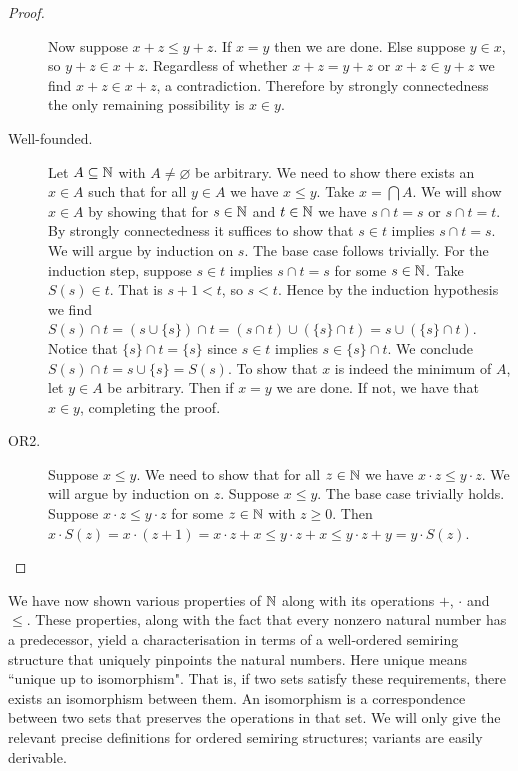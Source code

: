 \documentclass[../main.tex]{subfiles}
\begin{document}
\begin{proof}
\begin{description}
        Now suppose $x+z\leq y+z$. If $x=y$ then we are done. Else suppose $y\in x$, so $y+z\in x+z$. Regardless of whether $x+z=y+z$ or $x+z\in y+z$ we find $x+z\in x+z$, a contradiction. Therefore by strongly connectedness the only remaining possibility is $x\in y$.
        \item[Well-founded.] Let $A\subseteq\mathbb{N}$ with $A\neq\varnothing$ be arbitrary. We need to show there exists an $x\in A$ such that for all $y\in A$ we have $x\leq y$. Take $x=\bigcap A$. We will show $x\in A$ by showing that for $s\in\mathbb{N}$ and $t\in\mathbb{N}$ we have $s\cap t=s$ or $s\cap t=t$. By strongly connectedness it suffices to show that $s\in t$ implies $s\cap t=s$. We will argue by induction on $s$. The base case follows trivially. For the induction step, suppose $s\in t$ implies $s\cap t=s$ for some $s\in\mathbb{N}$. Take $S(s)\in t$. That is $s+1<t$, so $s<t$. Hence by the induction hypothesis we find $S(s)\cap t=(s\cup\{s\})\cap t=(s\cap t)\cup(\{s\}\cap t)=s\cup(\{s\}\cap t)$. Notice that $\{s\}\cap t=\{s\}$ since $s\in t$ implies $s\in\{s\}\cap t$. We conclude $S(s)\cap t=s\cup\{s\}=S(s)$. To show that $x$ is indeed the minimum of $A$, let $y\in A$ be arbitrary. Then if $x=y$ we are done. If not, we have that $x\in y$, completing the proof.
        
        \item[OR2.] Suppose $x\leq y$. We need to show that for all $z\in\mathbb{N}$ we have $x\cdot z\leq y\cdot z$. We will argue by induction on $z$. Suppose $x\leq y$. The base case trivially holds. Suppose $x\cdot z\leq y\cdot z$ for some $z\in\mathbb{N}$ with $z\geq0$. Then $x\cdot S(z)=x\cdot(z+1)=x\cdot z+x\leq y\cdot z+x\leq y\cdot z+y=y\cdot S(z)$.
    \end{description}
\end{proof}
We have now shown various properties of $\mathbb{N}$ along with its operations $+$, $\cdot$ and $\leq$. These properties, along with the fact that every nonzero natural number has a predecessor, yield a characterisation in terms of a well-ordered semiring structure that uniquely pinpoints the natural numbers. Here unique means ``unique up to isomorphism". That is, if two sets satisfy these requirements, there exists an isomorphism between them. An isomorphism is a correspondence between two sets that preserves the operations in that set. We will only give the relevant precise definitions for ordered semiring structures; variants are easily derivable.
\end{document}
